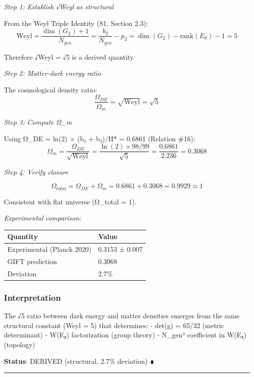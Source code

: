 \documentclass[11pt,a4paper]{article}
\begin{document}
\emph{Step 1: Establish √Weyl as structural}

From the Weyl Triple Identity (S1, Section 2.3):
\[\text{Weyl} = \frac{\dim(G_2) + 1}{N_{gen}} = \frac{b_2}{N_{gen}} - p_2 = \dim(G_2) - \text{rank}(E_8) - 1 = 5\]

Therefore √Weyl = √5 is a derived quantity.

\emph{Step 2: Matter-dark energy ratio}

The cosmological density ratio:
\[\frac{\Omega_{DE}}{\Omega_m} = \sqrt{\text{Weyl}} = \sqrt{5}\]

\emph{Step 3: Compute Ω\_m}

Using Ω\_DE = ln(2) × (b₂ + b₃)/H* = 0.6861 (Relation \#16):
\[\Omega_m = \frac{\Omega_{DE}}{\sqrt{\text{Weyl}}} = \frac{\ln(2) \times 98/99}{\sqrt{5}} = \frac{0.6861}{2.236} = 0.3068\]

\emph{Step 4: Verify closure}

\[\Omega_{total} = \Omega_{DE} + \Omega_m = 0.6861 + 0.3068 = 0.9929 \approx 1\]

Consistent with flat universe (Ω\_total = 1).

\emph{Experimental comparison}:

{\def\LTcaptype{none} %
\begin{longtable}[]{@{}ll@{}}
\toprule\noalign{}
Quantity & Value \\
\midrule\noalign{}
\endhead
\bottomrule\noalign{}
\endlastfoot
Experimental (Planck 2020) & 0.3153 ± 0.007 \\
GIFT prediction & 0.3068 \\
Deviation & 2.7\% \\
\end{longtable}
}

\subsubsection{Interpretation}\label{interpretation}

The √5 ratio between dark energy and matter densities emerges from the same structural constant (Weyl = 5) that determines:
- det(g) = 65/32 (metric determinant)
- \textbar W(E₈)\textbar{} factorization (group theory)
- N\_gen³ coefficient in \textbar W(E₈)\textbar{} (topology)

\textbf{Status}: DERIVED (structural, 2.7\% deviation) ∎

\begin{center}\rule{0.5\linewidth}{0.5pt}\end{center}
\end{document}
